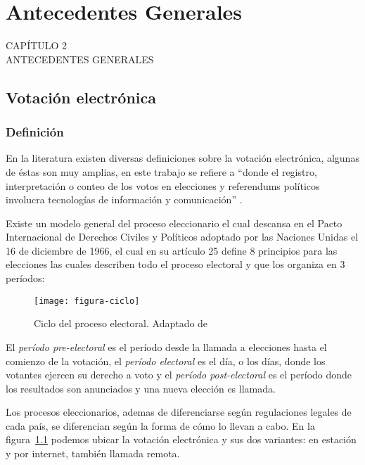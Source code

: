 
{

\Hide
\chapter{Antecedentes Generales}
}

\begin{titular} 
	\uppercase{
	capítulo 2 \\
	Antecedentes Generales \\
	}
\end{titular}


\section{Votación electrónica}
\subsection{Definición}

En la literatura existen diversas definiciones sobre la votación electrónica, algunas de éstas son
muy amplias, en este trabajo se refiere a ``donde el registro, interpretación o conteo de los votos
en elecciones y referendums políticos involucra tecnologías de información y comunicación'' 
\cite{InternationalInstituteforDemocracyandElectoralAssistance2011}. 


Existe un modelo general del proceso eleccionario el cual descansa en el Pacto Internacional de Derechos Civiles y Políticos
adoptado por las Naciones Unidas el 16 de diciembre de 1966, el cual en su artículo 25 define 8 
principios para las elecciones las cuales describen todo el proceso electoral y que \cite{Hinz2003} los organiza 
en 3 períodos: 

\begin{figure}[h!]
	\centering
	\texttt{[image: figura-ciclo]}
	\caption[Ciclo del proceso electoral]{Ciclo del proceso electoral. Adaptado de \protect\cite{Hinz2003}}
	\label{fig:tipos-votacion}
\end{figure}
\bigskip

El \textit{período pre-electoral} es el período desde la llamada a elecciones hasta el comienzo de la votación, 
el \textit{período electoral} es el día, o los días, donde los votantes ejercen su derecho a voto y el 
\textit{período post-electoral} es el período donde los resultados son anunciados y una nueva elección es llamada.

Los procesos eleccionarios, ademas de diferenciarse según regulaciones legales de cada país, 
se diferencian según la forma de cómo lo llevan a cabo. En la figura~\ref{fig:tipos-votacion} podemos ubicar la 
votación electrónica y sus dos variantes: en estación y por internet, también llamada remota.


